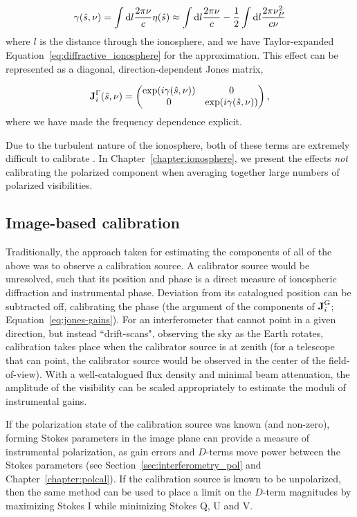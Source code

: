 \begin{equation}
\gamma(\hat{s},\nu) = \int {\rm d}l \frac{2\pi\nu}{c}\eta(\hat{s}) \approx \int {\rm d}l \frac{2\pi\nu}{c} - \frac{1}{2}\int {\rm d}l \frac{2\pi\nu_P^2}{c\nu}
\end{equation}
where $l$ is the distance through the ionosphere, and we have Taylor-expanded Equation~\ref{eq:diffractive_ionosphere} for the approximation. This effect can be represented as a diagonal, direction-dependent Jones matrix,

\begin{equation}
\textbf{J}_i^{\rm \Gamma}(\hat{s},\nu) = 
\begin{pmatrix}
\exp(i\gamma(\hat{s},\nu)) &0 \\
0 & \exp(i\gamma(\hat{s},\nu))\\
\end{pmatrix},
\end{equation}
where we have made the frequency dependence explicit.

Due to the turbulent nature of the ionosphere, both of these terms are extremely difficult to calibrate \citep{Intema.09, Vedantham.15}. In Chapter~\ref{chapter:ionosphere}, we present the effects \textit{not} calibrating the polarized component when averaging together large numbers of polarized visibilities.

\subsection{Image-based calibration}

Traditionally, the approach taken for estimating the components of all of the above was to observe a calibration source. A calibrator source would be unresolved, such that its position and phase is a direct measure of ionospheric diffraction and instrumental phase. Deviation from its catalogued position can be subtracted off, calibrating the phase (the argument of the components of $\textbf{J}_i^{\rm G}$; Equation~\ref{eq:jones-gains}). For an interferometer that cannot point in a given direction, but instead ``drift-scans", observing the sky as the Earth rotates, calibration takes place when the calibrator source is at zenith (for a telescope that can point, the calibrator source would be observed in the center of the field-of-view). With a well-catalogued flux density and minimal beam attenuation, the amplitude of the visibility can be scaled appropriately to estimate the moduli of instrumental gains.

If the polarization state of the calibration source was known (and non-zero), forming Stokes parameters in the image plane can provide a measure of instrumental polarization, as gain errors and $D$-terms move power between the Stokes parameters (see Section~\ref{sec:interferometry_pol} and Chapter~\ref{chapter:polcal}). If the calibration source is known to be unpolarized, then the same method can be used to place a limit on the $D$-term magnitudes by maximizing Stokes I while minimizing Stokes Q, U and V.

